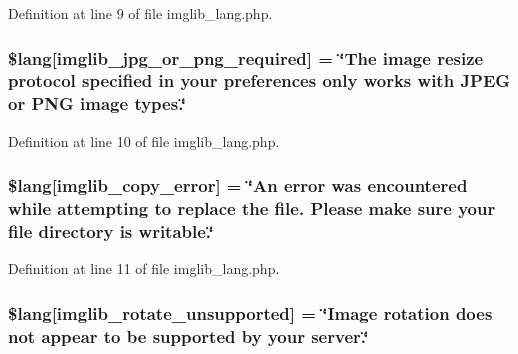Definition at line 9 of file imglib\+\_\+lang.\+php.

\subsubsection[{\texorpdfstring{\$lang}{$lang}}]{\setlength{\rightskip}{0pt plus 5cm}\$lang\mbox{[}\textquotesingle{}imglib\+\_\+jpg\+\_\+or\+\_\+png\+\_\+required\textquotesingle{}\mbox{]} = \char`\"{}The image resize protocol specified in your preferences only works with J\+P\+EG or P\+NG image types.\char`\"{}}\hypertarget{application_2language_2russian_2imglib__lang_8php_a2878e2b878871cd8010970f865d70e71}{}\label{application_2language_2russian_2imglib__lang_8php_a2878e2b878871cd8010970f865d70e71}


Definition at line 10 of file imglib\+\_\+lang.\+php.

\subsubsection[{\texorpdfstring{\$lang}{$lang}}]{\setlength{\rightskip}{0pt plus 5cm}\$lang\mbox{[}\textquotesingle{}imglib\+\_\+copy\+\_\+error\textquotesingle{}\mbox{]} = \char`\"{}An error was encountered while attempting to replace the file. Please make sure your file directory is writable.\char`\"{}}\hypertarget{application_2language_2russian_2imglib__lang_8php_a012b6a0d2b3a8ef934e8783d2fbd6535}{}\label{application_2language_2russian_2imglib__lang_8php_a012b6a0d2b3a8ef934e8783d2fbd6535}


Definition at line 11 of file imglib\+\_\+lang.\+php.

\subsubsection[{\texorpdfstring{\$lang}{$lang}}]{\setlength{\rightskip}{0pt plus 5cm}\$lang\mbox{[}\textquotesingle{}imglib\+\_\+rotate\+\_\+unsupported\textquotesingle{}\mbox{]} = \char`\"{}Image rotation does not appear to be supported by your server.\char`\"{}}\hypertarget{application_2language_2russian_2imglib__lang_8php_ab1c77c6b58fc5bf8e979ab4237ec87e7}{}\label{application_2language_2russian_2imglib__lang_8php_ab1c77c6b58fc5bf8e979ab4237ec87e7}



